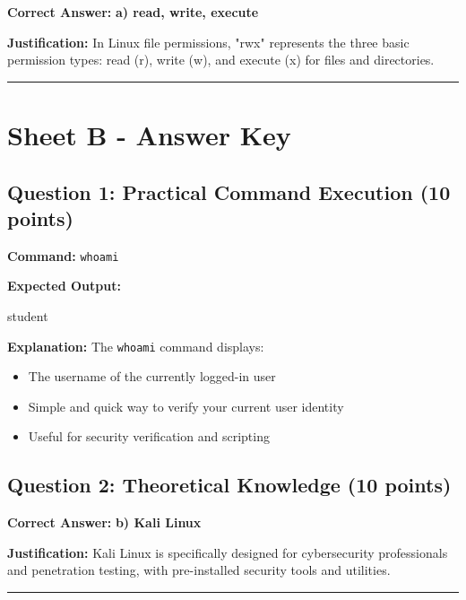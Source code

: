 \documentclass[a4paper,11pt]{article}
\begin{document}
\textbf{Correct Answer:} \textcolor{successgreen}{\textbf{a) read, write, execute}}

\textbf{Justification:} In Linux file permissions, "rwx" represents the three basic permission types: read (r), write (w), and execute (x) for files and directories.

\vspace{3mm}
\noindent\rule{\textwidth}{0.5pt}
\vspace{3mm}

\section*{Sheet B - Answer Key}

\subsection*{Question 1: Practical Command Execution (10 points)}

\textbf{Command:} \texttt{whoami}

\textbf{Expected Output:}
\begin{tcolorbox}[colback=lightgray,colframe=primaryblue,boxrule=0.5pt]
\ttfamily\small
student
\end{tcolorbox}

\textbf{Explanation:} The \texttt{whoami} command displays:
\begin{itemize}[leftmargin=*,itemsep=2pt]
    \item The username of the currently logged-in user
    \item Simple and quick way to verify your current user identity
    \item Useful for security verification and scripting
\end{itemize}

\subsection*{Question 2: Theoretical Knowledge (10 points)}

\textbf{Correct Answer:} \textcolor{successgreen}{\textbf{b) Kali Linux}}

\textbf{Justification:} Kali Linux is specifically designed for cybersecurity professionals and penetration testing, with pre-installed security tools and utilities.

\vspace{3mm}
\noindent\rule{\textwidth}{0.5pt}
\vspace{3mm}
\end{document}

